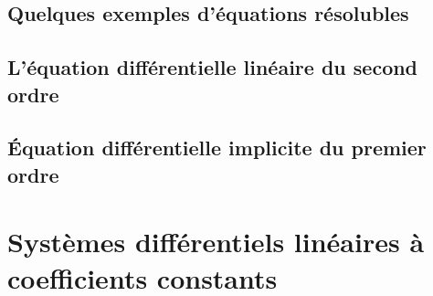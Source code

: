 
					\subsection{Quelques exemples d'équations résolubles}


					\subsection{L'équation différentielle linéaire du second ordre}


					\subsection{Équation différentielle implicite du premier ordre}


					\section{Systèmes différentiels linéaires à coefficients constants}



